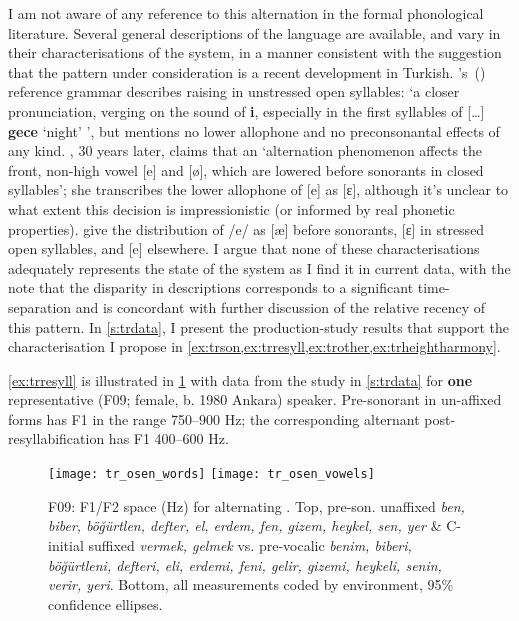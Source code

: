 I am not aware of any reference to this alternation in the formal phonological literature. Several general descriptions of the language are available, and vary in their characterisations of the system, in a manner consistent with the suggestion that the pattern under consideration is a recent development in Turkish. \citeauthor{Lewis1967}'s\ (\citeyear[14]{Lewis1967}) reference grammar describes raising in unstressed open syllables: `a closer pronunciation, verging on the sound of {\bf i}, especially in the first syllables of [\ldots] {\bf gece} `night' ', but mentions no lower allophone and no preconsonantal effects of any kind. \citet[512]{Kornfilt1997}, 30 years later, claims that an `alternation phenomenon affects the front, non-high vowel [e] and [ø], which are lowered before sonorants in closed syllables'; she transcribes the lower allophone of [e] as [ɛ], although it's unclear to what extent this decision is impressionistic (or informed by real phonetic properties). \citet{Goksel2005} give the distribution of /e/ as [æ] before sonorants, [ɛ] in stressed open syllables, and [e] elsewhere. I argue that none of these characterisations adequately represents the state of the system as I find it in current data, with the note that the disparity in descriptions corresponds to a significant time-separation and is concordant with further discussion of the relative recency of this pattern. In \cref{s:trdata}, I present the production-study results that support the characterisation I propose in \cref{ex:trson,ex:trresyll,ex:trother,ex:trheightharmony}.

\noindent\eqref{ex:trresyll} is illustrated in \cref{fig:trwords} with data from the study in \cref{s:trdata} for \textbf{one} representative (F09; female, b. 1980 Ankara) speaker. Pre-sonorant  in un-affixed forms has F1 in the range 750–900 Hz; the corresponding alternant  post-resyllabification has F1 400–600 Hz.

\begin{figure}[H]
  \centering
  \texttt{[image: tr\_osen\_words]}
    \texttt{[image: tr\_osen\_vowels]}
  \caption[pre-sonorant {\it heykel, sen, biber \ldots} vs. affixed pre-vocalic {\it heykel-i, sen-in, biber-i \ldots}]{F09: F1/F2 space (Hz) for alternating . Top, pre-son. unaffixed {\it b\textcolor{todo}{e}n, bib\textcolor{todo}{e}r, böğürtl\textcolor{todo}{e}n, deft\textcolor{todo}{e}r, \textcolor{todo}{e}l, erd\textcolor{todo}{e}m, f\textcolor{todo}{e}n, giz\textcolor{todo}{e}m, heyk\textcolor{todo}{e}l, s\textcolor{todo}{e}n, y\textcolor{todo}{e}r} \& C-initial suffixed {\it v\textcolor{link}{e}rmek, g\textcolor{link}{e}lmek} vs. pre-vocalic {\it b\textcolor{link}{e}nim, bib\textcolor{link}{e}ri, böğürtl\textcolor{link}{e}ni, deft\textcolor{link}{e}ri, \textcolor{link}{e}li, erd\textcolor{link}{e}mi, f\textcolor{link}{e}ni, g\textcolor{link}{e}lir, giz\textcolor{link}{e}mi, heyk\textcolor{link}{e}li, s\textcolor{link}{e}nin, v\textcolor{link}{e}rir, y\textcolor{link}{e}ri}. Bottom, all measurements coded by environment, 95\% confidence ellipses.}
  \label{fig:trwords}
\end{figure}

